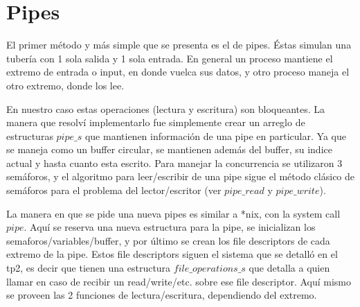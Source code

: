 \section{Pipes}

El primer método y más simple que se presenta es el de pipes. Éstas simulan una
tubería con 1 sola salida y 1 sola entrada. En general un proceso mantiene el
extremo de entrada o input, en donde vuelca sus datos, y otro proceso maneja el
otro extremo, donde los lee.

En nuestro caso estas operaciones (lectura y escritura) son bloqueantes. La
manera que resolví implementarlo fue simplemente crear un arreglo de
estructuras $pipe\_s$ que mantienen información de una pipe en particular. Ya
que se maneja como un buffer circular, se mantienen además del buffer, su
indice actual y hasta cuanto esta escrito. Para manejar la concurrencia se
utilizaron 3 semáforos, y el algoritmo para leer/escribir de una pipe sigue el
método clásico de semáforos para el problema del lector/escritor (ver
$pipe\_read$ y $pipe\_write$).

La manera en que se pide una nueva pipes es similar a *nix, con la system call
$pipe$. Aquí se reserva una nueva estructura para la pipe, se inicializan los
semaforos/variables/buffer, y por último se crean los file descriptors de cada
extremo de la pipe. Estos file descriptors siguen el sistema que se detalló en
el tp2, es decir que tienen una estructura $file\_operations\_s$ que detalla a
quien llamar en caso de recibir un read/write/etc. sobre ese file descriptor.
Aquí mismo se proveen las 2 funciones de lectura/escritura, dependiendo del
extremo.
